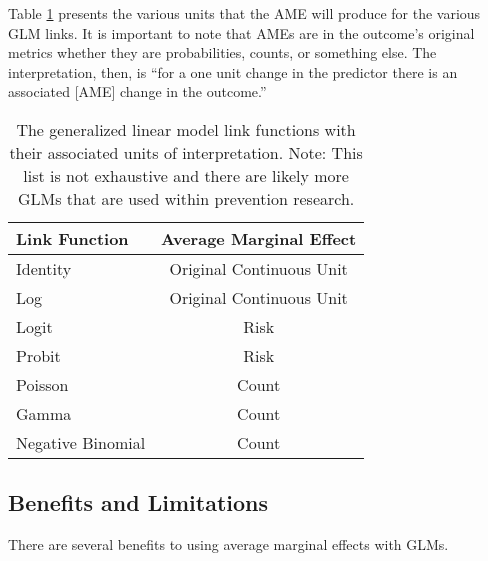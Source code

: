 \documentclass[]{DissertateUSU}
\begin{document}
Table \ref{tab_int} presents the various units that the AME will produce
for the various GLM links. It is important to note that AMEs are in the
outcome's original metrics whether they are probabilities, counts, or
something else. The interpretation, then, is ``for a one unit change in
the predictor there is an associated {[}AME{]} change in the outcome.''

\begin{table}[tb]
\centering
\caption{The generalized linear model link functions with their associated units of interpretation. Note: This list is not exhaustive and there are likely more GLMs that are used within prevention research.} 
\label{tab_int}
\begin{tabular}{lc}
\toprule
Link Function & Average Marginal Effect \\ 
\midrule
Identity & Original Continuous Unit \\ 
  Log & Original Continuous Unit \\ 
  Logit & Risk \\ 
  Probit & Risk \\ 
  Poisson & Count \\ 
  Gamma & Count \\ 
  Negative Binomial & Count \\ 
\bottomrule
\end{tabular}
\end{table}

\subsection{Benefits and Limitations}\label{benefits-and-limitations}

There are several benefits to using average marginal effects with GLMs.
\end{document}
